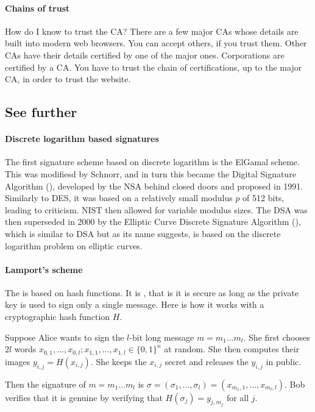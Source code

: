\documentclass[a4paper, 11pt, openany]{book}
\begin{document}
\paragraph{Chains of trust}

How do I know to trust the CA? There are a few major CAs whose details are built into modern web browsers. You can accept others, if you trust them. Other CAs have their details certified by one of the major ones. Corporations are certified by a CA. You have to trust the chain of certifications, up to the major CA, in order to trust the website.



\subsection{See further}

\paragraph{Discrete logarithm based signatures}
The first signature scheme based on discrete logarithm is the ElGamal scheme. This was modifiesd by Schnorr, and in turn this became the Digital Signature Algorithm (), developed by the NSA behind closed doors and proposed in 1991. Similarly to DES, it was based on a relatively small modulus $p$ of 512 bits, leading to criticism. NIST then allowed for variable modulus sizes. The DSA was then superseded in 2000 by the Elliptic Curve Discrete Signature Algorithm (), which is similar to DSA but as its name suggests, is based on the discrete logarithm problem on elliptic curves.

\paragraph{Lamport's scheme}
The  is based on hash functions. It is , that is it is secure as long as the private key is used to sign only a single message. Here is how it works with a cryptographic hash function $H$.

Suppose Alice wants to sign the $l$-bit long message $m = m_1 \dots m_l$. She first chooses $2l$ words $x_{0,1}, \dots, x_{0,l}; x_{1,1}, \dots, x_{1,l} \in \{0,1\}^n$ at random. She then computes their images $y_{i, j} = H(x_{i,j})$. She keeps the $x_{i,j}$ secret and releases the $y_{i,j}$ in public.

Then the signature of $m = m_1 \dots m_l$ is $\sigma = (\sigma_1, \dots, \sigma_l) = (x_{m_1,1}, \dots, x_{m_l,l})$. Bob verifies that it is genuine by verifying that $H(\sigma_j) = y_{j, m_j}$ for all $j$.
\end{document}
